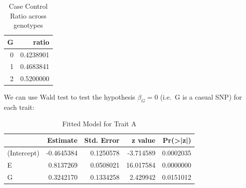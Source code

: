 \documentclass[
]{article}
\newenvironment{Shaded}{\begin{snugshade}}{\end{snugshade}}
\newcommand{\AttributeTok}[1]{\textcolor[rgb]{0.77,0.63,0.00}{#1}}
\newcommand{\DecValTok}[1]{\textcolor[rgb]{0.00,0.00,0.81}{#1}}
\newcommand{\DocumentationTok}[1]{\textcolor[rgb]{0.56,0.35,0.01}{\textbf{\textit{#1}}}}
\newcommand{\FunctionTok}[1]{\textcolor[rgb]{0.00,0.00,0.00}{#1}}
\newcommand{\NormalTok}[1]{#1}
\newcommand{\OtherTok}[1]{\textcolor[rgb]{0.56,0.35,0.01}{#1}}
\newcommand{\SpecialCharTok}[1]{\textcolor[rgb]{0.00,0.00,0.00}{#1}}
\newcommand{\StringTok}[1]{\textcolor[rgb]{0.31,0.60,0.02}{#1}}
\begin{document}
\begin{table}[H]

\caption{\label{tab:simulatedData}Case Control Ratio across genotypes}
\centering
\fontsize{10}{12}\selectfont
\begin{tabular}[t]{r|r}
\hline
G & ratio\\
\hline
0 & 0.4238901\\
\hline
1 & 0.4683841\\
\hline
2 & 0.5200000\\
\hline
\end{tabular}
\end{table}

We can use Wald test to test the hypothesis \(\beta_G = 0\) (i.e.~G is a
casual SNP) for each trait:

\begin{Shaded}
\end{Shaded}

\begin{table}[H]

\caption{\label{tab:unnamed-chunk-1}Fitted Model for Trait A}
\centering
\fontsize{10}{12}\selectfont
\begin{tabular}[t]{l|r|r|r|r}
\hline
  & Estimate & Std. Error & z value & Pr(>|z|)\\
\hline
(Intercept) & -0.4645384 & 0.1250578 & -3.714589 & 0.0002035\\
\hline
E & 0.8137269 & 0.0508021 & 16.017584 & 0.0000000\\
\hline
G & 0.3242170 & 0.1334258 & 2.429942 & 0.0151012\\
\hline
\end{tabular}
\end{table}
\end{document}
